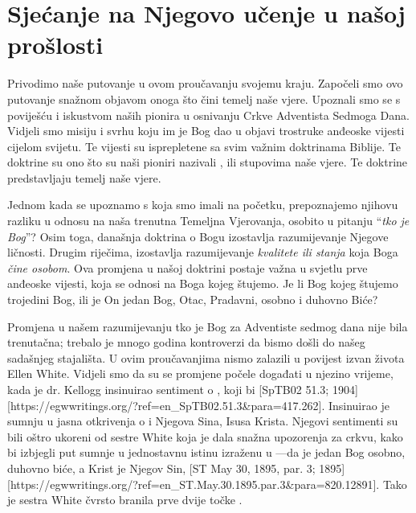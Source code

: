 \chapter{Sjećanje na Njegovo učenje u našoj prošlosti}

Privodimo naše putovanje u ovom proučavanju svojemu kraju. Započeli smo ovo putovanje snažnom objavom onoga što čini temelj naše vjere. Upoznali smo se s poviješću i iskustvom naših pionira u osnivanju Crkve Adventista Sedmoga Dana. Vidjeli smo misiju i svrhu koju im je Bog dao u objavi trostruke anđeoske vijesti cijelom svijetu. Te vijesti su isprepletene sa svim važnim doktrinama Biblije. Te doktrine su ono što su naši pioniri nazivali , ili stupovima naše vjere. Te doktrine predstavljaju temelj naše vjere.

Jednom kada se upoznamo s  koja smo imali na početku, prepoznajemo njihovu razliku u odnosu na naša trenutna Temeljna Vjerovanja, osobito u pitanju “\textit{tko je Bog}”? Osim toga, današnja doktrina o Bogu izostavlja razumijevanje Njegove ličnosti. Drugim riječima, izostavlja razumijevanje \textit{kvalitete ili stanja} koja Boga \textit{čine osobom}. Ova promjena u našoj doktrini postaje važna u svjetlu prve anđeoske vijesti, koja se odnosi na Boga kojeg štujemo. Je li Bog kojeg štujemo trojedini Bog, ili je On jedan Bog, Otac, Pradavni, osobno i duhovno Biće?

Promjena u našem razumijevanju tko je Bog za Adventiste sedmog dana nije bila trenutačna; trebalo je mnogo godina kontroverzi da bismo došli do našeg sadašnjeg stajališta. U ovim proučavanjima nismo zalazili u povijest izvan života Ellen White. Vidjeli smo da su se promjene počele događati u njezino vrijeme, kada je dr. Kellogg insinuirao sentiment o , koji bi [SpTB02 51.3; 1904][https://egwwritings.org/?ref=en\_SpTB02.51.3&para=417.262]. Insinuirao je sumnju u jasna otkrivenja o  i Njegova Sina, Isusa Krista. Njegovi sentimenti su bili oštro ukoreni od sestre White koja je dala snažna upozorenja za crkvu, kako bi izbjegli put sumnje u jednostavnu istinu izraženu u —da je jedan Bog osobno, duhovno biće, a Krist je Njegov Sin, [ST May 30, 1895, par. 3; 1895][https://egwwritings.org/?ref=en\_ST.May.30.1895.par.3&para=820.12891]. Tako je sestra White čvrsto branila prve dvije točke .

